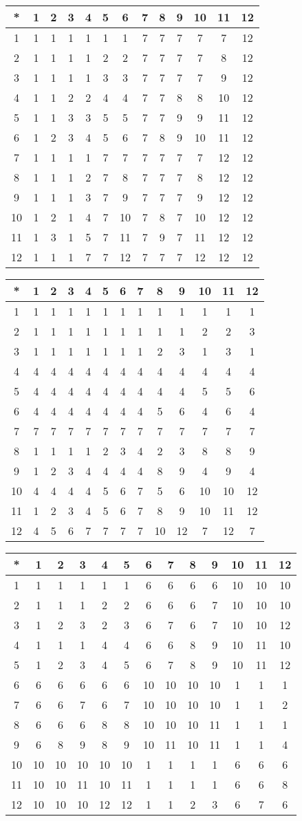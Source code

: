 \begin{tabular}[t]{c|cccccccccccc}
*&1&2&3&4&5&6&7&8&9&10&11&12 \\ \hline
    1&1&1&1&1&1&1&7&7&7&7&7&12 \\
    2&1&1&1&1&2&2&7&7&7&7&8&12 \\
    3&1&1&1&1&3&3&7&7&7&7&9&12 \\
    4&1&1&2&2&4&4&7&7&8&8&10&12 \\
    5&1&1&3&3&5&5&7&7&9&9&11&12 \\
    6&1&2&3&4&5&6&7&8&9&10&11&12 \\
    7&1&1&1&1&7&7&7&7&7&7&12&12 \\
    8&1&1&1&2&7&8&7&7&7&8&12&12 \\
    9&1&1&1&3&7&9&7&7&7&9&12&12 \\
    10&1&2&1&4&7&10&7&8&7&10&12&12 \\
    11&1&3&1&5&7&11&7&9&7&11&12&12 \\
    12&1&1&1&7&7&12&7&7&7&12&12&12 
\end{tabular}


\begin{tabular}[t]{c|cccccccccccc}
*&1&2&3&4&5&6&7&8&9&10&11&12 \\ \hline
    1&1&1&1&1&1&1&1&1&1&1&1&1 \\
    2&1&1&1&1&1&1&1&1&1&2&2&3 \\
    3&1&1&1&1&1&1&1&2&3&1&3&1 \\
    4&4&4&4&4&4&4&4&4&4&4&4&4 \\
    5&4&4&4&4&4&4&4&4&4&5&5&6 \\
    6&4&4&4&4&4&4&4&5&6&4&6&4 \\
    7&7&7&7&7&7&7&7&7&7&7&7&7 \\
    8&1&1&1&1&2&3&4&2&3&8&8&9 \\
    9&1&2&3&4&4&4&4&8&9&4&9&4 \\
    10&4&4&4&4&5&6&7&5&6&10&10&12 \\
    11&1&2&3&4&5&6&7&8&9&10&11&12 \\
    12&4&5&6&7&7&7&7&10&12&7&12&7 
\end{tabular}


\begin{tabular}[t]{c|cccccccccccc}
*&1&2&3&4&5&6&7&8&9&10&11&12 \\ \hline
    1&1&1&1&1&1&6&6&6&6&10&10&10 \\
    2&1&1&1&2&2&6&6&6&7&10&10&10 \\
    3&1&2&3&2&3&6&7&6&7&10&10&12 \\
    4&1&1&1&4&4&6&6&8&9&10&11&10 \\
    5&1&2&3&4&5&6&7&8&9&10&11&12 \\
    6&6&6&6&6&6&10&10&10&10&1&1&1 \\
    7&6&6&7&6&7&10&10&10&10&1&1&2 \\
    8&6&6&6&8&8&10&10&10&11&1&1&1 \\
    9&6&8&9&8&9&10&11&10&11&1&1&4 \\
    10&10&10&10&10&10&1&1&1&1&6&6&6 \\
    11&10&10&11&10&11&1&1&1&1&6&6&8 \\
    12&10&10&10&12&12&1&1&2&3&6&7&6 
\end{tabular}



